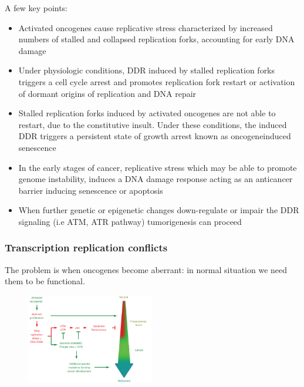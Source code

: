 A few key points: 
\begin{itemize}
\tightlist
\item Activated oncogenes cause replicative stress
characterized by increased numbers of stalled and collapsed replication
forks, accounting for early DNA damage
\item Under physiologic conditions,
DDR induced by stalled replication forks triggers a cell cycle arrest
and promotes replication fork restart or activation of dormant origins
of replication and DNA repair
\item Stalled replication forks induced by
activated oncogenes are not able to restart, due to the constitutive
insult. Under these conditions, the induced DDR triggers a persistent
state of growth arrest known as oncogeneinduced senescence
\item In the
early stages of cancer, replicative stress which may be able to promote
genome instability, induces a DNA damage response acting as an
anticancer barrier inducing senescence or apoptosis
\item When further
genetic or epigenetic changes down-regulate or impair the DDR signaling
(i.e ATM, ATR pathway) tumorigenesis can proceed
\end{itemize}

\hypertarget{transcription-replication-conflicts}{%
\subsubsection{Transcription replication
conflicts}\label{transcription-replication-conflicts}}

The problem is when oncogenes become aberrant: in normal situation we
need them to be functional.

\begin{figure}[H]
\centering
\includegraphics[width=0.5\textwidth]{../_resources/61c42671b1b95714d2335e1c23a75024.png} 
\label{fig:senescence}
\end{figure}

